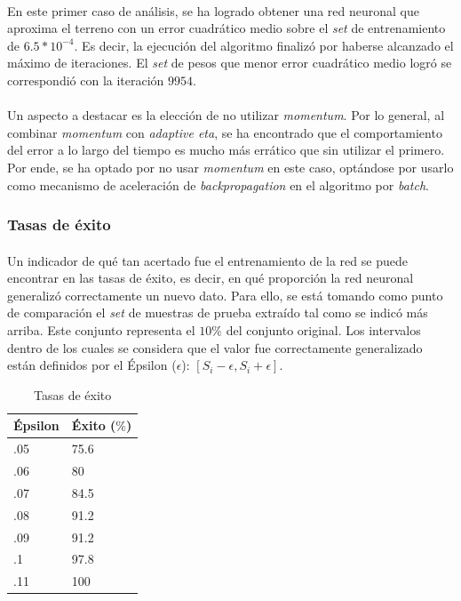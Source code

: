 \documentclass[12pt, twocolumn]{article}
\begin{document}
	\paragraph{} En este primer caso de análisis, se ha logrado obtener una red neuronal que aproxima el terreno con un error cuadrático medio sobre el \textit{set} de entrenamiento de $6.5*10^{-4}$. Es decir, la ejecución del algoritmo finalizó por haberse alcanzado el máximo de iteraciones. El \textit{set} de pesos que menor error cuadrático medio logró se correspondió con la iteración $9954$.
	
	\paragraph{} Un aspecto a destacar es la elección de no utilizar \textit{momentum}. Por lo general, al combinar \textit{momentum} con \textit{adaptive eta}, se ha encontrado que el comportamiento del error a lo largo del tiempo es mucho más errático que sin utilizar el primero. Por ende, se ha optado por no usar \textit{momentum} en este caso, optándose por usarlo como mecanismo de aceleración de \textit{backpropagation} en el algoritmo por \textit{batch}.
	
	\subsubsection{Tasas de éxito}
	
	\paragraph{} Un indicador de qué tan acertado fue el entrenamiento de la red se puede encontrar en las tasas de éxito, es decir, en qué proporción la red neuronal generalizó correctamente un nuevo dato. Para ello, se está tomando como punto de comparación el \textit{set} de muestras de prueba extraído tal como se indicó más arriba. Este conjunto representa el $10\%$ del conjunto original. Los intervalos dentro de los cuales se considera que el valor fue correctamente generalizado están definidos por el Épsilon ($\epsilon$): $\left[S_{i}-\epsilon, S_{i}+\epsilon\right]$.  
	
	\begin{table}[H]
		\centering
		\begin{tabular}{ll}
			\hline
			Épsilon & Éxito ($\%$)\\ \hline
			.05     & 75.6  \\
			.06     & 80    \\
			.07     & 84.5  \\
			.08     & 91.2  \\
			.09     & 91.2  \\
			.1      & 97.8  \\
			.11     & 100   \\ \hline
			\end{tabular}
			\caption{Tasas de éxito}
			\label{ex1}
	\end{table}
	
\end{document}
